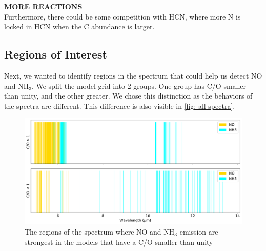\documentclass[twoside, single, authoryear, semicolon, 12pt]{lion-msc}
\newcommand{\4}{$_4$}
\newcommand{\3}{$_3$}
\newcommand{\2}{$_2$}
\begin{document}

\textbf{MORE REACTIONS}\\
Furthermore, there could be some competition with HCN, where more N is locked in HCN when the C abundance is larger. 

\subsection{Regions of Interest}
Next, we wanted to identify regions in the spectrum that could help us detect NO and NH\3. We split the model grid into 2 groups. One group has C/O smaller than unity, and the other greater. We chose this distinction as the behaviors of the spectra are different. This difference is also visible in \autoref{fig: all spectra}. 



\begin{figure}[!ht]
    \centering
    \includegraphics[width=\linewidth]{Figures/ClassificationCO.pdf}
    \caption{The regions of the spectrum where NO and NH\3 emission are strongest in the models that have a C/O smaller than unity}
    \label{fig: classes}
\end{figure}
\end{document}
